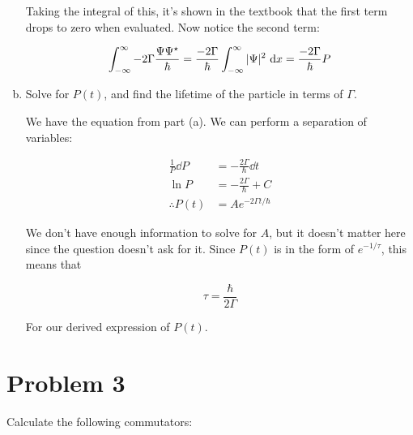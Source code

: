 \documentclass[10pt]{article}
\begin{document}
\begin{enumerate}[(a)]
\begin{solution}
            Taking the integral of this, it's shown in the textbook that the first term drops to zero when evaluated. Now notice the second term:

            \[ \int_{-\infty}^{\infty} -2\Gamma \frac{\Psi \Psi^\star}{\hbar} = \frac{-2\Gamma}{\hbar} \int_{-\infty}^{\infty} |\Psi|^2 \ \mathrm d x = \frac{-2\Gamma}{\hbar} P\]
        \end{solution}
        \item Solve for $P(t)$, and find the lifetime of the particle in terms of $\Gamma$.
        
        \begin{solution}
            We have the equation from part (a). We can perform a separation of variables:

            \begin{align*}
                \frac{1}{P} \dd P &= -\frac{2\Gamma}{\hbar} \dd t\\
                \ln P &= -\frac{2\Gamma}{\hbar} + C\\
                \therefore P(t) &= Ae^{-2\Gamma t/\hbar}
            \end{align*}

            We don't have enough information to solve for $A$, but it doesn't matter here since the question doesn't ask for it. Since $P(t)$ is in the form of  $e^{-1/\tau}$, this means that

            \[ \tau = \frac{\hbar}{2\Gamma}\]
            
            For our derived expression of $P(t)$.

        \end{solution}
    \end{enumerate}


    \pagebreak

    \section*{Problem 3}

    Calculate the following commutators:
\end{document}
